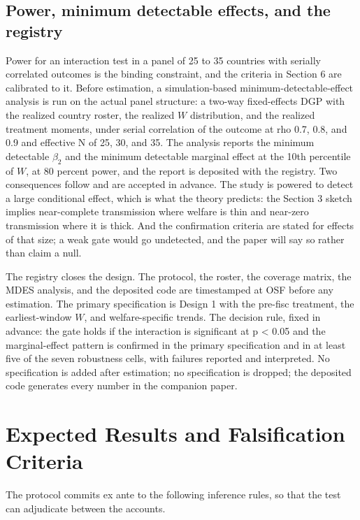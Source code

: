 \subsection{Power, minimum detectable effects, and the registry}

Power for an interaction test in a panel of 25 to 35 countries with serially correlated outcomes is the binding constraint, and the criteria in Section 6 are calibrated to it. Before estimation, a simulation-based minimum-detectable-effect analysis is run on the actual panel structure: a two-way fixed-effects DGP with the realized country roster, the realized $W$ distribution, and the realized treatment moments, under serial correlation of the outcome at rho 0.7, 0.8, and 0.9 and effective N of 25, 30, and 35. The analysis reports the minimum detectable $\beta_2$ and the minimum detectable marginal effect at the 10th percentile of $W$, at 80 percent power, and the report is deposited with the registry. Two consequences follow and are accepted in advance. The study is powered to detect a large conditional effect, which is what the theory predicts: the Section 3 sketch implies near-complete transmission where welfare is thin and near-zero transmission where it is thick. And the confirmation criteria are stated for effects of that size; a weak gate would go undetected, and the paper will say so rather than claim a null.

The registry closes the design. The protocol, the roster, the coverage matrix, the MDES analysis, and the deposited code are timestamped at OSF before any estimation. The primary specification is Design 1 with the pre-fisc treatment, the earliest-window $W$, and welfare-specific trends. The decision rule, fixed in advance: the gate holds if the interaction is significant at p < 0.05 and the marginal-effect pattern is confirmed in the primary specification and in at least five of the seven robustness cells, with failures reported and interpreted. No specification is added after estimation; no specification is dropped; the deposited code generates every number in the companion paper.

\section{Expected Results and Falsification Criteria}

The protocol commits ex ante to the following inference rules, so that the test can adjudicate between the accounts.

